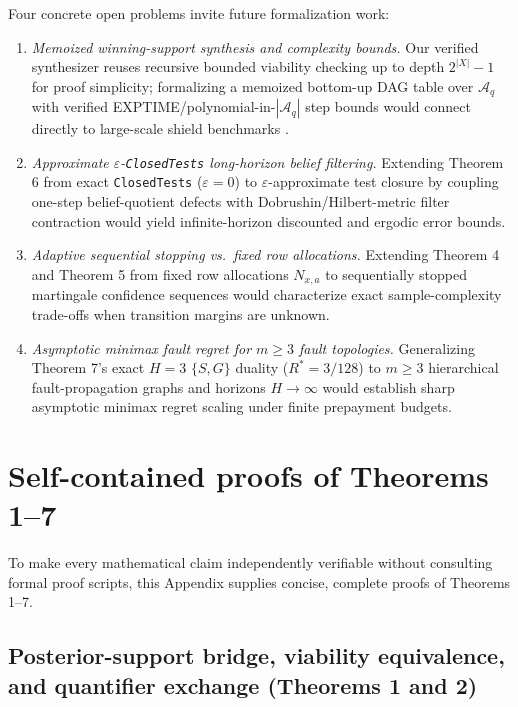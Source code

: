 \documentclass[11pt,a4paper]{article}
\providecommand{\tightlist}{\setlength{\itemsep}{2pt}\setlength{\parskip}{0pt}}
\begin{document}
Four concrete open problems invite future formalization work:

\begin{enumerate}
\def\labelenumi{\arabic{enumi}.}
\tightlist
\item
  \emph{Memoized winning-support synthesis and complexity bounds.} Our
  verified synthesizer reuses recursive bounded viability checking up to
  depth \(2^{|X|}-1\) for proof simplicity; formalizing a memoized
  bottom-up DAG table over \(\mathcal{A}_q\) with verified
  EXPTIME/polynomial-in-\(|\mathcal{A}_q|\) step bounds would connect
  directly to large-scale shield benchmarks \citep{junges2021}.
\item
  \emph{Approximate \(\varepsilon\)-\texttt{ClosedTests} long-horizon
  belief filtering.} Extending Theorem 6 from exact \texttt{ClosedTests}
  (\(\varepsilon = 0\)) to \(\varepsilon\)-approximate test closure by
  coupling one-step belief-quotient defects with
  Dobrushin/Hilbert-metric filter contraction \citep{dobrushin1956}
  would yield infinite-horizon discounted and ergodic error bounds.
\item
  \emph{Adaptive sequential stopping vs.~fixed row allocations.}
  Extending Theorem 4 and Theorem 5 from fixed row allocations
  \(N_{x,a}\) to sequentially stopped martingale confidence sequences
  \citep{wald1950, abbasiYadkori2011} would characterize exact
  sample-complexity trade-offs when transition margins are unknown.
\item
  \emph{Asymptotic minimax fault regret for \(m \ge 3\) fault
  topologies.} Generalizing Theorem 7's exact \(H=3\) \(\{S, G\}\)
  duality (\(R^* = 3/128\)) to \(m \ge 3\) hierarchical
  fault-propagation graphs and horizons \(H \to \infty\) would establish
  sharp asymptotic minimax regret scaling under finite prepayment
  budgets.
\end{enumerate}

\appendix

\section{Self-contained proofs of Theorems
1--7}\label{self-contained-proofs-of-theorems-17}

To make every mathematical claim independently verifiable without
consulting formal proof scripts, this Appendix supplies concise,
complete proofs of Theorems 1--7.

\subsection{Posterior-support bridge, viability equivalence, and
quantifier exchange (Theorems 1 and
2)}\label{posterior-support-bridge-viability-equivalence-and-quantifier-exchange-theorems-1-and-2}
\end{document}
